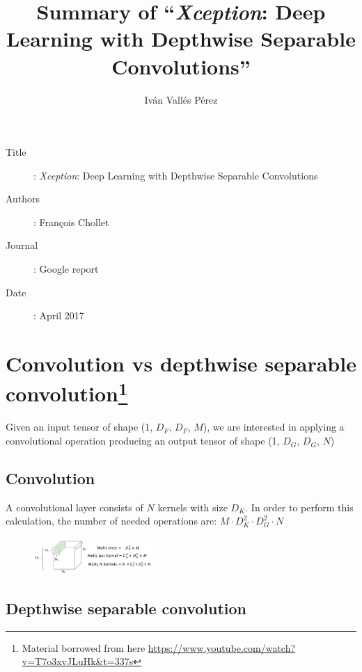 \documentclass[10pt,a4paper]{article}
\title{Summary of ``\textit{Xception}: Deep Learning with Depthwise Separable Convolutions''}
\date{\vspace{-5ex}}
\author{Iván Vallés Pérez}
\begin{document}
\maketitle

\begin{description}
	\item[Title]: \textit{Xception}: Deep Learning with Depthwise Separable Convolutions
	\item[Authors]: François Chollet
	\item[Journal]: Google report
	\item[Date]: April 2017
\end{description}

\section*{Convolution vs depthwise separable convolution\footnote{Material borrowed from here \url{https://www.youtube.com/watch?v=T7o3xvJLuHk&t=337s}}}
Given an input tensor of shape (1, $D_F$, $D_F$, $M$), we are interested in applying a convolutional operation producing an output tensor of shape (1, $D_G$, $D_G$, $N$)

\subsection*{Convolution}
A convolutional layer consists of $N$ kernels with size $D_K$. In order to perform this calculation, the number of needed operations are: $M \cdot D_K^2 \cdot D_G^2 \cdot N$

\begin{figure}[h!]
	\centering
	\includegraphics[width=0.4\textwidth]{img/conv_ops.png}
\end{figure}

\subsection*{Depthwise separable convolution}
\end{document}
